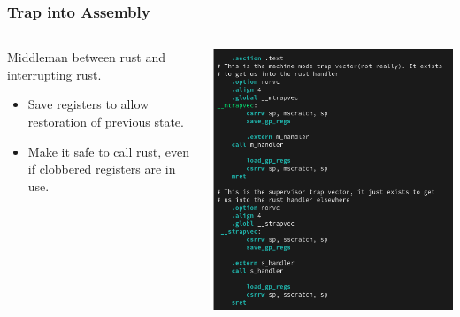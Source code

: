 \documentclass{beamer}
\begin{document}
\begin{frame}
  \frametitle{Trap into Assembly}
  \begin{columns}
    \begin{column}{0.5\textwidth}
      Middleman between rust and interrupting rust.
      \begin{itemize}
      \item Save registers to allow restoration of previous state.\\
      \item Make it safe to call rust, even if clobbered registers are in use.
      \end{itemize}
    \end{column}
    \begin{column}{0.5\textwidth}
      \includegraphics[width=\textwidth]{trapasm.png}
    \end{column}
  \end{columns}
\end{frame}
\end{document}
